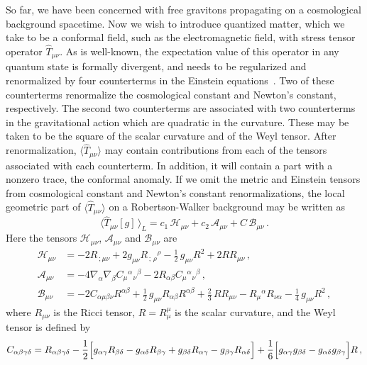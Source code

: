 \documentclass[preprint,prd,showpacs,superscriptaddress]{revtex4}
\begin{document}
So far, we have been concerned with free gravitons propagating on a cosmological background spacetime. Now
we wish to introduce quantized matter, which we take to be a conformal field, such as the electromagnetic field,
with stress tensor operator $\hat{T}_{\mu\nu}$. As is well-known, the expectation value of this operator in any quantum 
state is formally divergent, and needs to be regularized and renormalized by four counterterms  in the Einstein 
equations~\cite{BD}. Two of these
counterterms renormalize the cosmological constant and Newton's constant, respectively.  The second two counterterms
are associated with two counterterms in the gravitational action which are quadratic  in the curvature. These may be
taken to be the square of the scalar curvature and of the Weyl tensor. After renormalization, $\langle\hat{T}_{\mu\nu}\rangle$
may contain contributions from each of the tensors associated with each counterterm. In addition, it will contain a part
with a nonzero trace, the conformal anomaly. If we omit the metric and Einstein tensors from cosmological constant and 
Newton's constant renormalizations, the local geometric part of $\langle\hat{T}_{\mu\nu}\rangle$ on a Robertson-Walker
background may be written as
\begin{equation}\label{E:local}
	\langle\hat{T}_{\mu\nu}[g]\,\rangle_{L}=c_{1}\,\mathcal{H}_{\mu\nu}+c_{2}\,\mathcal{A}_{\mu\nu}+C\,\mathcal{B}_{\mu\nu}\,.
\end{equation}
Here the tensors $\mathcal{H}_{\mu\nu}$, $\mathcal{A}_{\mu\nu}$ and $\mathcal{B}_{\mu\nu}$ are
\begin{align}
	\mathcal{H}_{\mu\nu}&=-2R_{\,;\mu\nu}+2g_{\mu\nu}R_{\,;\,\rho}{}^{\rho}-\frac{1}{2}\,g_{\mu\nu}R^{2}+2RR_{\mu\nu}\,,\\
	\mathcal{A}_{\mu\nu}&=-4\nabla_{\alpha}\nabla_{\beta}C_{\mu}{}^{\alpha}{}_{\nu}{}^{\beta}-2R_{\alpha\beta}
	C_{\mu}{}^{\alpha}{}_{\nu}{}^{\beta}\,,     \label{E:Amunu}  \\
	\mathcal{B}_{\mu\nu}&=-2C_{\alpha\mu\beta\nu}R^{\alpha\beta}+\frac{1}{2}\,g_{\mu\nu}R_{\alpha\beta}R^{\alpha\beta}+
	\frac{2}{3}\,RR_{\mu\nu}-R_{\mu}{}^{\alpha}R_{\nu\alpha}-\frac{1}{4}\,g_{\mu\nu}R^{2}\,,
\end{align}
where $R_{\mu\nu}$ is the Ricci tensor, $R=R^\mu_\mu$ is the scalar curvature, and the Weyl tensor is defined by
\begin{equation}\label{E:Weyl}
	 C_{\alpha\beta\gamma\delta}=R_{\alpha\beta\gamma\delta}-\frac{1}{2}\Bigl[g_{\alpha\gamma}R_{\beta\delta}-
	 g_{\alpha\delta}R_{\beta\gamma}+g_{\beta\delta}R_{\alpha\gamma}-g_{\beta\gamma}R_{\alpha\delta}\Bigr]+
	 \frac{1}{6}\Bigl[g_{\alpha\gamma}g_{\beta\delta}-g_{\alpha\delta}g_{\beta\gamma}\Bigr]R\,,
\end{equation}
\end{document}
